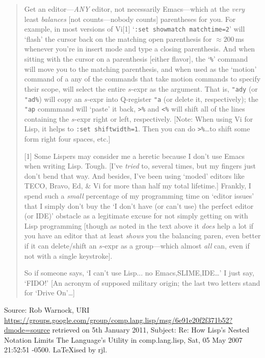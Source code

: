\documentclass[a4paper]{article}
\begin{document}
\begin{quote}
	\begin{itemize}
		Get an editor---\emph{ANY} editor, not necessarily Emacs---which
		at the \emph{very} least \emph{balances} [not counts---nobody counts]
		parentheses for you. For example, in most versions of Vi[1]
		`\verb,:set showmatch matchtime=2,' will `flash' the cursor back on
		the matching open parenthesis for $\approx 200$\,ms whenever you're in
		insert mode and type a closing parenthesis. And when sitting
		with the cursor on a parenthesis [either flavor], the `\verb,%,' command
		will move you to the matching parenthesis, and when used as
		the `motion' command of a any of the commands that take motion
		commands to specify their scope, will select the entire $s$-expr
		as the argument. That is, \verb,"ady, (or \verb,"ad%,) will copy an $s$-expr
		into Q-register \verb,"a, (or delete it, respectively); the \verb,"ap, commmand
		will `paste' it back, \verb,>%, and \verb,<%, will shift all of the lines
		containing the $s$-expr right or left, respectively. [Note: When
		using Vi for Lisp, it helps to \verb,:set shiftwidth=1,. Then you
		can do \verb,>%,\ldots to shift some form right four spaces, etc.] 
	\end{itemize}

	[1] Some Lispers may consider me a heretic because I don't use Emacs
		when writing Lisp. Tough. [I've \emph{tried} to, several times, but
		my fingers just don't bend that way. And besides, I've been using
		`moded' editors like TECO, Bravo, Ed, \& Vi for more than half my
		total lifetime.] Frankly, I spend such a \emph{small} percentage of
		my programming time on `editor issues' that I simply don't buy
		the `I don't have (or can't use) the perfect editor (or IDE)'
		obstacle as a legitimate excuse for not simply getting on with
		Lisp programming [though as noted in the text above it \emph{does}
		help a lot if you have an editor that at least \emph{shows} you the
		balancing paren, even better if it can delete/shift an $s$-expr
		as a group---which almost \emph{all} can, even if not with a single
		keystroke].

		So if someone says, `I can't use Lisp... no {Emacs,SLIME,IDE}\ldots'
		I just say, `FIDO!' [An acronym of supposed military origin;
		the last two letters stand for `Drive On'\ldots] 
\end{quote}
Source: Rob Warnock, URI
\url{https://groups.google.com/group/comp.lang.lisp/msg/6e91e20f2f371b52?dmode=source}
retrieved on 5th January 2011,
Subject: Re: How Lisp's Nested Notation Limits The Language's Utility in comp.lang.lisp,
Sat, 05 May 2007 21:52:51 -0500.  \LaTeX ised by rjl.
\end{document}
